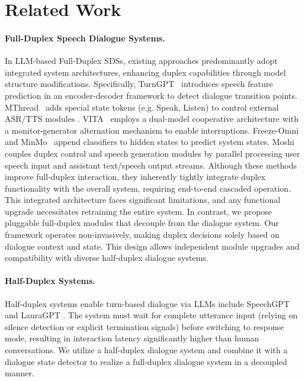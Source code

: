 \section{Related Work}
\paragraph{Full-Duplex Speech Dialogue Systems.}
 
In LLM-based Full-Duplex SDSs, existing approaches predominantly adopt integrated system architectures, enhancing duplex capabilities through model structure modifications.
Specifically, TurnGPT~\cite{ekstedt2020turngpt} introduces speech feature prediction in an encoder-decoder framework to detect dialogue transition points. MThread~\cite{wang2024fullduplexspeechdialoguescheme} adds special state tokens (e.g. Speak, Listen) to control external ASR/TTS modules \cite{baevski2020wav2vec}.
VITA~\cite{fu2024vitaopensourceinteractiveomni} employs a dual-model cooperative architecture with a monitor-generator alternation mechanism to enable interruptions.
Freeze-Omni~\cite{wang2024freezeomnismartlowlatency} and MinMo~\cite{chen2025MinMomultimodallargelanguage} append classifiers to hidden states to predict system states.
Moshi~\cite{défossez2024moshispeechtextfoundationmodel} couples duplex control and speech generation modules by parallel processing user speech input and assistant text/speech output streams.
Although these methods improve full-duplex interaction, they inherently tightly integrate duplex functionality with the overall system, requiring end-to-end cascaded operation. This integrated architecture faces significant limitations, and any functional upgrade necessitates retraining the entire system. 
In contrast, we propose pluggable full-duplex modules that decouple from the dialogue system. 
Our framework operates non-invasively, making duplex decisions solely based on dialogue context and state. This design allows independent module upgrades and compatibility with diverse half-duplex dialogue systems.

\paragraph{Half-Duplex Systems.} Half-duplex systems enable turn-based dialogue via LLMs include SpeechGPT \cite{zhang2023speechgptempoweringlargelanguage} and LauraGPT \cite{du2024lauragptlistenattendunderstand}. The system must wait for complete utterance input (relying on silence detection or explicit termination signals) before switching to response mode, resulting in interaction latency significantly higher than human conversations.
We utilize a half-duplex dialogue system and combine it with a dialogue state detector to realize a full-duplex dialogue system in a decoupled manner.


